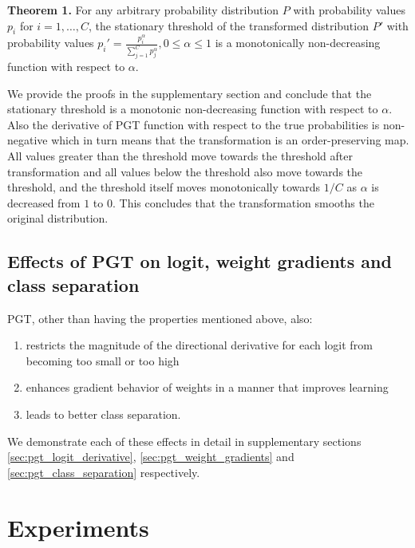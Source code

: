 \documentclass[runningheads]{llncs}
\begin{document}
\textbf{Theorem 1.} For any arbitrary probability distribution $P$ with probability
values $p_i$ for $i=1,\dots,C$, the stationary threshold of the transformed distribution
$P'$ with probability values $p_i'=\frac{p_i^{\alpha}}{\sum _{j=1}^C p_j^\alpha}, 0 \leq
\alpha \leq 1$ is a monotonically non-decreasing function with respect to $\alpha$.



We provide the proofs in the supplementary section and conclude that the stationary
threshold is a monotonic non-decreasing function with respect to $\alpha$. Also the
derivative of PGT function with respect to the true probabilities is non-negative which
in turn means that the transformation is an order-preserving map. All values greater
than the threshold move towards the threshold after transformation and all values below
the threshold also move towards the threshold, and the threshold itself moves
monotonically towards $1/C$ as $\alpha$ is decreased from $1$ to $0$. This concludes
that the transformation smooths the original distribution.

\subsection{Effects of PGT on logit, weight gradients and class separation}
\label{sec:pgt_effects}

PGT, other than having the properties mentioned above, also:
\begin{enumerate}
\item restricts the magnitude of the directional derivative for each logit from becoming too small or too high
\item enhances gradient behavior of weights in a manner that improves learning
\item leads to better class separation.
\end{enumerate}

We demonstrate each of these effects in detail in supplementary sections
\ref{sec:pgt_logit_derivative}, \ref{sec:pgt_weight_gradients} and
\ref{sec:pgt_class_separation} respectively.

\section{Experiments}
\label{sec:Expe}
\end{document}
